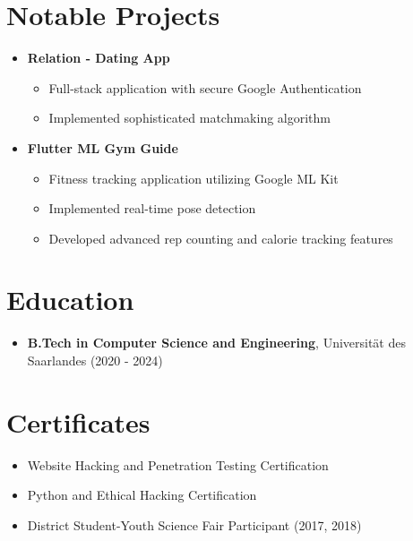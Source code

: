 \documentclass[a4paper,10pt]{article}
\begin{document}
\begin{multicols}{2}
\section*{Notable Projects}
\vspace{-0.5em}
\begin{itemize}[leftmargin=1em,itemsep=0.5em,parsep=0pt]
    \item \textbf{Relation - Dating App}
        \begin{itemize}[leftmargin=1em,itemsep=0.2em,parsep=0pt]
            \item Full-stack application with secure Google Authentication
            \item Implemented sophisticated matchmaking algorithm
        \end{itemize}
    \item \textbf{Flutter ML Gym Guide}
        \begin{itemize}[leftmargin=1em,itemsep=0.2em,parsep=0pt]
            \item Fitness tracking application utilizing Google ML Kit
            \item Implemented real-time pose detection
            \item Developed advanced rep counting and calorie tracking features
        \end{itemize}
\end{itemize}

\section*{Education}
\vspace{-0.5em}
\begin{itemize}[leftmargin=1em,itemsep=0.5em,parsep=0pt]
    \item \textbf{B.Tech in Computer Science and Engineering}, Universität des Saarlandes (2020 - 2024)
\end{itemize}

\section*{Certificates}
\vspace{-0.5em}
\begin{itemize}[leftmargin=1em,itemsep=0.1em,parsep=0pt]
    \item Website Hacking and Penetration Testing Certification
    \item Python and Ethical Hacking Certification
    \item District Student-Youth Science Fair Participant (2017, 2018)
\end{itemize}
\end{multicols}
\end{document}
